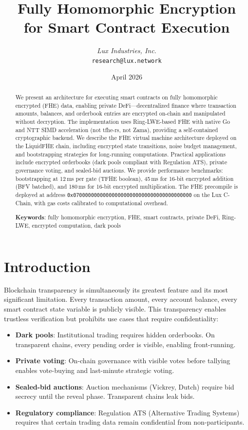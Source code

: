 \documentclass[11pt,a4paper]{article}
\title{\textbf{Fully Homomorphic Encryption\\for Smart Contract Execution}}
\author{
\textit{Lux Industries, Inc.}\\
\texttt{research@lux.network}
}
\date{April 2026}
\begin{document}
\luxcoverpage

\begin{abstract}
We present an architecture for executing smart contracts on fully homomorphic
encrypted (FHE) data, enabling private DeFi---decentralized finance where transaction
amounts, balances, and orderbook entries are encrypted on-chain and manipulated
without decryption. The implementation uses Ring-LWE-based FHE with native Go and
NTT SIMD acceleration (not tfhe-rs, not Zama), providing a self-contained
cryptographic backend. We describe the FHE virtual machine architecture deployed
on the LiquidFHE chain, including encrypted state transitions, noise budget
management, and bootstrapping strategies for long-running computations. Practical
applications include encrypted orderbooks (dark pools compliant with Regulation ATS),
private governance voting, and sealed-bid auctions. We provide performance benchmarks:
bootstrapping at 12\,ms per gate (TFHE boolean), 45\,ms for 16-bit encrypted
addition (BFV batched), and 180\,ms for 16-bit encrypted multiplication. The FHE
precompile is deployed at address
\texttt{0x0700000000000000000000000000000000000000} on the Lux C-Chain, with gas
costs calibrated to computational overhead.

\textbf{Keywords}: fully homomorphic encryption, FHE, smart contracts, private DeFi,
Ring-LWE, encrypted computation, dark pools
\end{abstract}

\tableofcontents
\newpage

\section{Introduction}
\label{sec:introduction}

Blockchain transparency is simultaneously its greatest feature and its most
significant limitation. Every transaction amount, every account balance, every
smart contract state variable is publicly visible. This transparency enables
trustless verification but prohibits use cases that require confidentiality:

\begin{itemize}[leftmargin=2em]
  \item \textbf{Dark pools}: Institutional trading requires hidden orderbooks. On
        transparent chains, every pending order is visible, enabling front-running.
  \item \textbf{Private voting}: On-chain governance with visible votes before
        tallying enables vote-buying and last-minute strategic voting.
  \item \textbf{Sealed-bid auctions}: Auction mechanisms (Vickrey, Dutch) require
        bid secrecy until the reveal phase. Transparent chains leak bids.
  \item \textbf{Regulatory compliance}: Regulation ATS (Alternative Trading Systems)
        requires that certain trading data remain confidential from non-participants.
\end{itemize}
\end{document}

